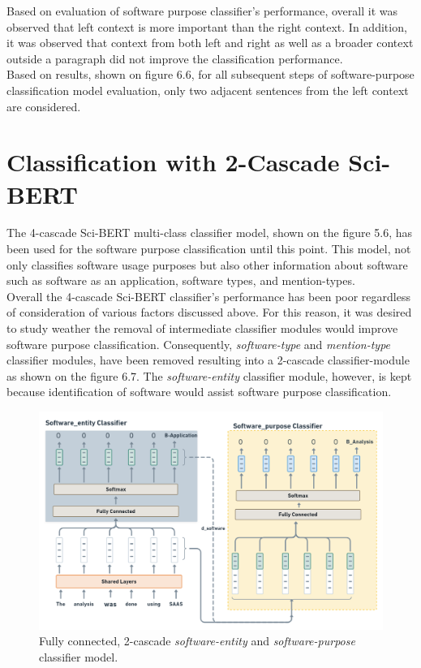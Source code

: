 Based on evaluation of software purpose classifier's performance, overall it was observed that left context is more important than the right context. In addition, it was observed that context from both left and right as well as a broader context outside a paragraph did not improve the classification performance. \\

Based on results, shown on figure 6.6, for all subsequent steps of software-purpose classification model evaluation, only two adjacent sentences from the left context are considered. \\


\section{Classification with 2-Cascade Sci-BERT}
\label{sec:chapter06:2lc}

The 4-cascade \ac{Sci-BERT} multi-class classifier model, shown on the figure 5.6, has been used for the software purpose classification until this point. This model, not only classifies software usage purposes but also other information about software such as software as an application, software types, and mention-types. \\


Overall the 4-cascade \ac{Sci-BERT} classifier’s performance has been poor regardless of consideration of various factors discussed above. For this reason, it was desired to study weather the removal of intermediate classifier modules would improve software purpose classification. Consequently, \emph{software-type} and \emph{mention-type} classifier modules, have been removed resulting into a 2-cascade classifier-module as shown on the figure 6.7. The \emph{software-entity} classifier module, however, is kept because identification of software would assist software purpose classification.  \\

\begin{figure}[htbp]
	\centering
	\includegraphics[width=.65\textwidth]{4.graphics/figures/ch_5/2LC}
	\caption{Fully connected, 2-cascade \emph{software-entity} and \emph{software-purpose} classifier model.}
	\label{fig:chapter06:2lc}
\end{figure}

